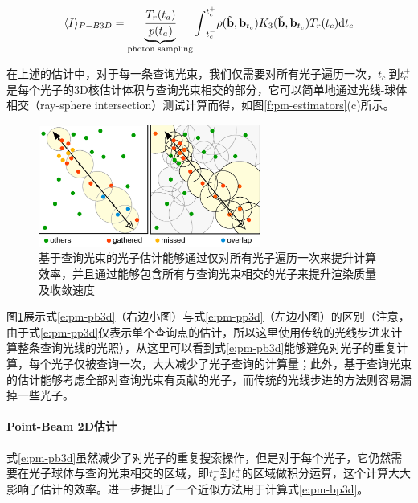 \begin{equation}\label{e:pm-pb3d}
	\langle I\rangle_{P-B3D}=\underbrace{ \cfrac{T_r(t_a)}{p(t_a)}}_{\text{photon sampling}}{\rm \int}^{t^{+}_{c}}_{t^{-}_{c}}\rho(\tilde{\mathbf{b}},\mathbf{b}_{t_c})K_3(\tilde{\mathbf{b}},\mathbf{b}_{t_c})T_r(t_c){\rm d}t_c
\end{equation}

在上述的估计中，对于每一条查询光束，我们仅需要对所有光子遍历一次，$t^{-}_c$到$t^{+}_c$是每个光子的3D核估计体积与查询光束相交的部分，它可以简单地通过光线-球体相交（ray-sphere intersection）测试计算而得，如图\ref{f:pm-estimators}(c)所示。

\begin{figure}
	\sidecaption
	\includegraphics[width=0.65\textwidth]{figures/pm/beam-gathering}
	\caption{基于查询光束的光子估计能够通过仅对所有光子遍历一次来提升计算效率，并且通过能够包含所有与查询光束相交的光子来提升渲染质量及收敛速度}
	\label{f:pm-beam-gathering}
\end{figure}

图\ref{f:pm-beam-gathering}展示式\ref{e:pm-pb3d}（右边小图）与式\ref{e:pm-pp3d}（左边小图）的区别（注意，由于式\ref{e:pm-pp3d}仅表示单个查询点的估计，所以这里使用传统的光线步进来计算整条查询光线的光照），从这里可以看到式\ref{e:pm-pb3d}能够避免对光子的重复计算，每个光子仅被查询一次，大大减少了光子查询的计算量；此外，基于查询光束的估计能够考虑全部对查询光束有贡献的光子，而传统的光线步进的方法则容易漏掉一些光子。



\paragraph{Point-Beam 2D估计}
式\ref{e:pm-pb3d}虽然减少了对光子的重复搜索操作，但是对于每个光子，它仍然需要在光子球体与查询光束相交的区域，即$t^{-}_{c}$到$t^{+}_{c}$的区域做积分运算，这个计算大大影响了估计的效率。\cite{a:TheBeamRadianceEstimateforVolumetricPhotonMapping}进一步提出了一个近似方法用于计算式\ref{e:pm-bp3d}。

